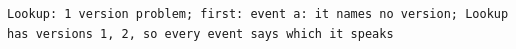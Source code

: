 \begin{lstlisting}[language={},basicstyle=\ttfamily\scriptsize,breaklines=true]
Lookup: 1 version problem; first: event a: it names no version; Lookup has versions 1, 2, so every event says which it speaks
\end{lstlisting}
